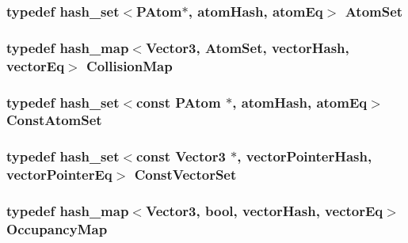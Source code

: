 \subsubsection{\setlength{\rightskip}{0pt plus 5cm}typedef hash\_\-set$<${\bf PAtom}$\ast$, {\bf atom\-Hash}, {\bf atom\-Eq}$>$ {\bf Atom\-Set}}\label{PHashing_8h_b81c252f709273da66828303391a927b}


\subsubsection{\setlength{\rightskip}{0pt plus 5cm}typedef hash\_\-map$<$Vector3, {\bf Atom\-Set}, {\bf vector\-Hash}, {\bf vector\-Eq}$>$ {\bf Collision\-Map}}\label{PHashing_8h_67100482bbabee5539fe8a269f262d0b}


\subsubsection{\setlength{\rightskip}{0pt plus 5cm}typedef hash\_\-set$<$const {\bf PAtom} $\ast$, {\bf atom\-Hash}, {\bf atom\-Eq}$>$ {\bf Const\-Atom\-Set}}\label{PHashing_8h_64e5d74662e630b935acbd9a2691366e}


\subsubsection{\setlength{\rightskip}{0pt plus 5cm}typedef hash\_\-set$<$const Vector3 $\ast$, {\bf vector\-Pointer\-Hash}, {\bf vector\-Pointer\-Eq}$>$ {\bf Const\-Vector\-Set}}\label{PHashing_8h_d45395666a139c74a645a4d4e2de6ef5}


\subsubsection{\setlength{\rightskip}{0pt plus 5cm}typedef hash\_\-map$<$Vector3, bool, {\bf vector\-Hash}, {\bf vector\-Eq}$>$ {\bf Occupancy\-Map}}\label{PHashing_8h_153a9be57b5ba72228b4bf5195d5ba6c}


